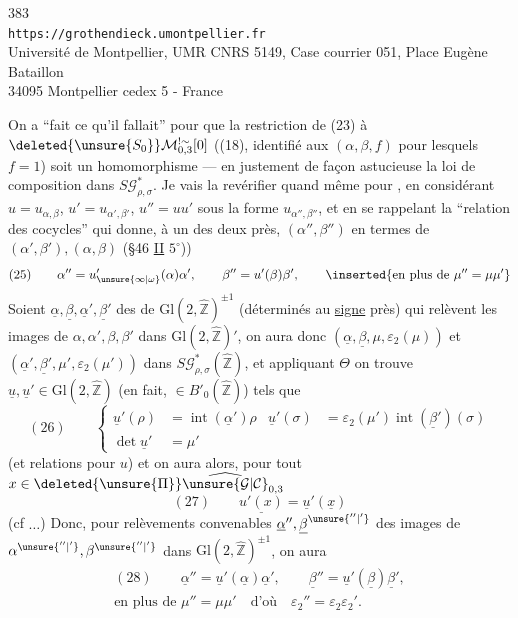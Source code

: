 \begin{center}
383\\
\texttt{https://grothendieck.umontpellier.fr}\\
Université de Montpellier, UMR CNRS 5149, Case courrier 051, Place Eugène Bataillon\\
34095 Montpellier cedex 5 - France
\end{center}

On a ``fait ce qu'il fallait'' pour que la restriction de (23) à $\deleted{\unsure{S_0}}\mathcal M_{0,3}^{!\sim}[0]$ ((18), identifié aux $(\alpha,\beta,f)$ pour lesquels $f=1$) soit un homomorphisme  --- en  justement de façon astucieuse  la loi de composition dans $S\mathcal G_{\rho,\sigma}^{*}$.
Je vais la revérifier quand même pour , en considérant $u=u_{\alpha,\beta}$, $u'=u_{\alpha',\beta'}$, $u''=uu'$ sous la forme $u_{\alpha'',\beta''}$, et en se rappelant la ``relation des cocycles'' qui donne, à un des deux  près, $(\alpha'',\beta'')$ en termes de $(\alpha',\beta'),(\alpha,\beta)$ (\S 46 \uline{II} $5^\circ$))
\[
(25)\qquad
\alpha''=u'_{\unsure{\infty|\omega}}(\alpha)\alpha',\qquad
\beta''=u'(\beta)\beta',\qquad
\inserted{\text{en plus de }\mu''=\mu\mu'}
\]
Soient  $\underline\alpha,\underline\beta,\underline\alpha',\underline\beta'$ des   de $\mathrm{Gl}(2,\widehat{\mathbb Z})^{\pm1}$ (déterminés au \uline{signe} près) qui relèvent les images de $\alpha,\alpha',\beta,\beta'$ dans $\mathrm{Gl}(2,\widehat{\mathbb Z})'$, on aura donc $(\underline\alpha,\underline\beta,\mu,\varepsilon_2(\mu))$ et $(\underline\alpha',\underline\beta',\mu',\varepsilon_2(\mu'))$ dans $S\mathcal G_{\rho,\sigma}^{*}(\widehat{\mathbb Z})$, et appliquant $\Theta$ on trouve $\underline u,\underline u'\in\mathrm{Gl}(2,\widehat{\mathbb Z})$ (en fait, $\in B'_0(\widehat{\mathbb Z})$) tels que
\[
(26)\qquad
\left\{\begin{aligned}
\underline u'(\rho)&=\operatorname{int}(\underline\alpha')\rho
&\underline u'(\sigma)&=\varepsilon_2(\mu')\operatorname{int}(\underline\beta')(\sigma)\\
\det\underline u'&=\mu'
\end{aligned}\right.
\]
(et relations  pour $u$)
et on aura alors, pour tout $x\in\deleted{\unsure{\Pi}}\widehat{\unsure{\mathcal G|\mathcal C}}_{0,3}$
\[
(27)\qquad \underline{u'(x)}=\underline u'(\underline x)
\]
(cf $\ldots$) Donc, pour  relèvements convenables $\underline\alpha'',\underline\beta^{\unsure{''|'}}$ des images de $\alpha^{\unsure{''|'}},\beta^{\unsure{''|'}}$ dans $\mathrm{Gl}(2,\widehat{\mathbb Z})^{\pm1}$, on aura
\[
\begin{gathered}
(28)\qquad
\underline\alpha''=\underline u'(\underline\alpha)\underline\alpha',\qquad
\underline\beta''=\underline u'(\underline\beta)\underline\beta',\\
\text{en plus de }\mu''=\mu\mu'\quad\text{d'où}\quad
\varepsilon_2''=\varepsilon_2\varepsilon_2'.
\end{gathered}
\]

